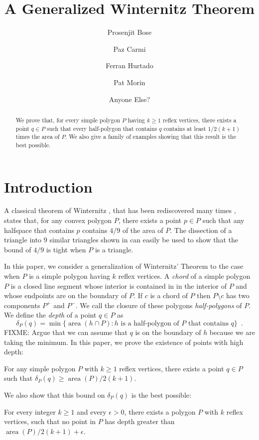 \documentclass{article}
\title{A Generalized Winternitz Theorem}
\author{Prosenjit Bose \and 
	Paz Carmi \and
	Ferran Hurtado \and
	Pat Morin \and
	Anyone Else?}
\DeclareMathOperator{\area}{area}
\begin{document}
\maketitle
\begin{abstract}
We prove that, for every simple polygon $P$ having $k\ge 1$ reflex
vertices, there exists a point $q\in P$ such that every half-polygon
that contains $q$ contains at least $1/2(k+1)$ times the area of $P$.
We also give a family of examples showing that this result is the best
possible.
\end{abstract}

\section{Introduction}

A classical theorem of Winternitz \cite{X}, that has been rediscovered
many times \cite{a,b,c,d,e}, states that, for any convex polygon $P$,
there exists a point $p\in P$ such that any halfspace that contains
$p$ contains $4/9$ of the area of $P$.  The dissection of a triangle
into 9 similar triangles shown in  can easily
be used to show that the bound of $4/9$ is tight when $P$ is a triangle.

In this paper, we consider a generalization of Winternitz' Theorem to
the case when $P$ is a simple polygon having $k$ reflex vertices.  A
\emph{chord} of a simple polygon $P$ is a closed line segment whose
interior is contained in in the interior of $P$ and whose endpoints
are on the boundary of $P$.  If $c$ is a chord of $P$ then $P\setminus
c$ has two components $P^+$ and $P^-$.  We call the closure of these
polygons \emph{half-polygons} of $P$.
We define the
\emph{depth} of a point $q\in P$ as 
\[
     \delta_P(q) = \min\{\area(h\cap P) : \mbox{$h$ is a half-polygon
	of $P$ that contains $q$} \} \enspace .
\]
FIXME: Argue that we can assume that $q$ is on the boundary of $h$
because we are taking the minimum.
In this paper, we prove the existence of points with high depth:

\begin{thm}
For any simple polygon $P$ with $k \ge 1$ reflex vertices, there 
exists a point $q\in P$ such that $\delta_P(q)\ge \area(P)/2(k+1)$.
\end{thm}
We also show that this bound on $\delta_P(q)$ is the best possible:
\begin{thm}
For every integer $k\ge 1$ and every $\epsilon > 0$,
there exists a polygon $P$ with $k$ reflex vertices, such that no point
in $P$ has depth greater than  $\area(P)/2(k+1) + \epsilon$.
\end{thm}
\end{document}
